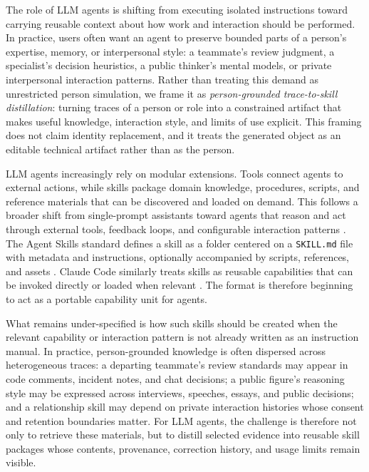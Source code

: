 \documentclass{llmxive}
\begin{document}
The role of LLM agents is shifting from executing isolated instructions toward carrying reusable context about how work and interaction should be performed. In practice, users often want an agent to preserve bounded parts of a person's expertise, memory, or interpersonal style: a teammate's review judgment, a specialist's decision heuristics, a public thinker's mental models, or private interpersonal interaction patterns. Rather than treating this demand as unrestricted person simulation, we frame it as \emph{person-grounded trace-to-skill distillation}: turning traces of a person or role into a constrained artifact that makes useful knowledge, interaction style, and limits of use explicit. This framing does not claim identity replacement, and it treats the generated object as an editable technical artifact rather than as the person.

LLM agents increasingly rely on modular extensions. Tools connect agents to external actions, while skills package domain knowledge, procedures, scripts, and reference materials that can be discovered and loaded on demand. This follows a broader shift from single-prompt assistants toward agents that reason and act through external tools, feedback loops, and configurable interaction patterns \citep{yaoReAct2023,schickToolformer2023,shinnReflexion2023,wuAutoGen2023}. The Agent Skills standard defines a skill as a folder centered on a \texttt{SKILL.md} file with metadata and instructions, optionally accompanied by scripts, references, and assets \citep{agentskills2026}. Claude Code similarly treats skills as reusable capabilities that can be invoked directly or loaded when relevant \citep{claudeskills2026}. The format is therefore beginning to act as a portable capability unit for agents.

What remains under-specified is how such skills should be created when the relevant capability or interaction pattern is not already written as an instruction manual. In practice, person-grounded knowledge is often dispersed across heterogeneous traces: a departing teammate's review standards may appear in code comments, incident notes, and chat decisions; a public figure's reasoning style may be expressed across interviews, speeches, essays, and public decisions; and a relationship skill may depend on private interaction histories whose consent and retention boundaries matter. For LLM agents, the challenge is therefore not only to retrieve these materials, but to distill selected evidence into reusable skill packages whose contents, provenance, correction history, and usage limits remain visible.
\end{document}
